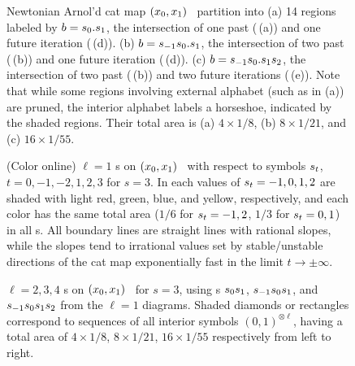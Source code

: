 \begin{description}
\begin{figure}
	\caption{\label{fig:SingleCatBW}
Newtonian Arnol'd cat map $(x_{0},x_{1})$  \statesp\ partition into
(a) 14 regions labeled by {\brick} $b = {s_{0}}.{s_{1}}$, the
intersection of one past (\,(a)) and
one future iteration (\,(d)).
(b) {\brick} $b = {s_{-1}}{s_{0}}.{s_{1}}$, the
intersection of two past (\,(b)) and
one future iteration (\,(d)).
(c) {\brick} $b = {s_{-1}}{s_{0}}.{s_{1}}{s_{2}}$, the
intersection of two past (\,(b)) and
two future iterations (\,(e)).
Note that while some regions involving external alphabet (such as
 in (a)) are pruned, the interior alphabet labels a horseshoe,
indicated by the shaded regions.
Their total area is (a) $4 \times
1/8$, (b) $8 \times 1/21$, and (c) $16 \times 1/55$.
	}
\end{figure}

\begin{figure}
	\caption{\label{fig:SingleCat1Symbol}
(Color online) $\ell = 1$ {\statesp s} on $(x_{0},x_{1})$  \statesp\ with respect
to symbols ${s_{t}}$, $t = 0, -1, -2, 1, 2, 3$ for $s=3$. In each {\brick} values
of ${s_{t}} = -1, 0, 1, 2$ are shaded with light red, green, blue, and yellow,
respectively, and each color has the same total area ($1/6$ for ${s_{t}} = -1,
2$, $1/3$ for ${s_{t}} = 0, 1$) in all {\brick s}. All boundary lines are straight
lines with rational slopes, while the slopes tend to irrational values set by
stable/unstable directions of the cat map exponentially fast in the limit $t
\rightarrow \pm\infty$.
	}
\end{figure}

\begin{figure}
	\caption{\label{fig:SingleCatMultiSymbol}
$\ell = 2, 3, 4$ {\statesp s} on $(x_{0},x_{1})$  \statesp\ for $s=3$, using {\brick s}
${s_{0}} {s_{1}}$, ${s_{-1}} {s_{0}} {s_{1}}$, and ${s_{-1}} {s_{0}} {s_{1}} {s_{2}}$ from the $\ell = 1$
diagrams. Shaded diamonds or rectangles correspond to sequences of all
interior symbols $(0, 1)^{\otimes \ell}$, having a total area of $4 \times
1/8$, $8 \times 1/21$, $16 \times 1/55$ respectively from left to right.
	}
\end{figure}


\end{description}
